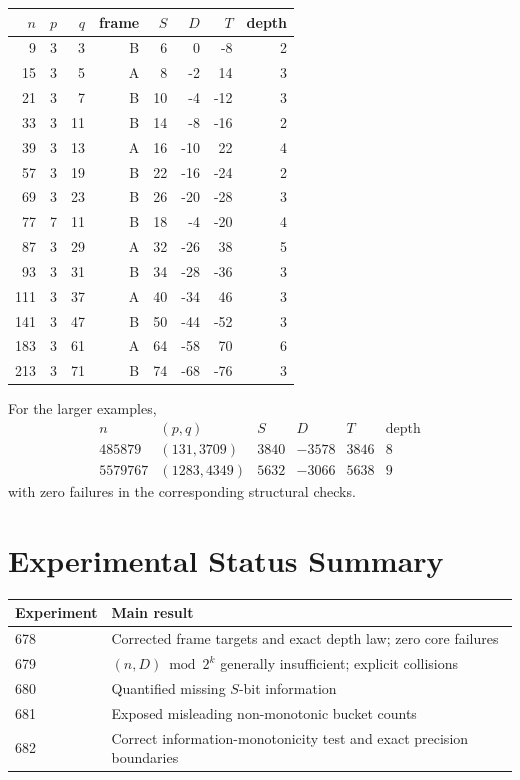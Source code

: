 \documentclass[11pt,a4paper]{article}
\begin{document}
\begin{longtable}{rrrrrrrr}
\toprule
$n$ & $p$ & $q$ & frame & $S$ & $D$ & $T$ & depth \\
\midrule
9   & 3 & 3  & B & 6  & 0    & -8   & 2 \\
15  & 3 & 5  & A & 8  & -2   & 14   & 3 \\
21  & 3 & 7  & B & 10 & -4   & -12  & 3 \\
33  & 3 & 11 & B & 14 & -8   & -16  & 2 \\
39  & 3 & 13 & A & 16 & -10  & 22   & 4 \\
57  & 3 & 19 & B & 22 & -16  & -24  & 2 \\
69  & 3 & 23 & B & 26 & -20  & -28  & 3 \\
77  & 7 & 11 & B & 18 & -4   & -20  & 4 \\
87  & 3 & 29 & A & 32 & -26  & 38   & 5 \\
93  & 3 & 31 & B & 34 & -28  & -36  & 3 \\
111 & 3 & 37 & A & 40 & -34  & 46   & 3 \\
141 & 3 & 47 & B & 50 & -44  & -52  & 3 \\
183 & 3 & 61 & A & 64 & -58  & 70   & 6 \\
213 & 3 & 71 & B & 74 & -68  & -76  & 3 \\
\bottomrule
\end{longtable}

For the larger examples,
\[
\begin{array}{c|c|c|c|c|c}
 n & (p,q) & S & D & T & \text{depth}\\
\hline
485879 & (131,3709) & 3840 & -3578 & 3846 & 8\\
5579767 & (1283,4349) & 5632 & -3066 & 5638 & 9
\end{array}
\]
with zero failures in the corresponding structural checks.

\section{Experimental Status Summary}

\begin{center}
\begin{tabular}{ll}
\toprule
Experiment & Main result \\
\midrule
678 & Corrected frame targets and exact depth law; zero core failures \\
679 & $(n,D)\bmod2^k$ generally insufficient; explicit collisions \\
680 & Quantified missing $S$-bit information \\
681 & Exposed misleading non-monotonic bucket counts \\
682 & Correct information-monotonicity test and exact precision boundaries \\
\bottomrule
\end{tabular}
\end{center}
\end{document}

